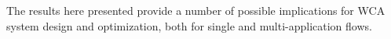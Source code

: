 \documentclass[10pt,letterpaper]{article}
\providecommand{\DIFdelbegin}{\protect\color{red}} %
\newcommand{\DIFscaledelfig}{0.5}
\newlength{\DIFdelgraphicswidth} %
\newlength{\DIFdelgraphicsheight} %
\newcommand{\DIFdelincludegraphics}[2][]{%
\sbox{\DIFdelgraphicsbox}{\DIFOincludegraphics[#1]{#2}}%
\settoboxwidth{\DIFdelgraphicswidth}{\DIFdelgraphicsbox} %
\settoboxtotalheight{\DIFdelgraphicsheight}{\DIFdelgraphicsbox} %
\scalebox{\DIFscaledelfig}{%
\parbox[b]{\DIFdelgraphicswidth}{\usebox{\DIFdelgraphicsbox}\\[-\baselineskip] \rule{\DIFdelgraphicswidth}{0em}}\llap{\resizebox{\DIFdelgraphicswidth}{\DIFdelgraphicsheight}{%
\setlength{\unitlength}{\DIFdelgraphicswidth}%
\begin{picture}(1,1)%
\thicklines\linethickness{2pt} %
{\color[rgb]{1,0,0}\put(0,0){\framebox(1,1){}}}%
{\color[rgb]{1,0,0}\put(0,0){\line( 1,1){1}}}%
{\color[rgb]{1,0,0}\put(0,1){\line(1,-1){1}}}%
\end{picture}%
}\hspace*{3pt}}} %
} %
\DeclareRobustCommand{\DIFdelbegin}{\DIFOdelbegin \let\includegraphics\DIFdelincludegraphics} %
\begin{document}
The results here presented provide a number of possible implications for WCA system design and optimization, both for single and multi-application flows.

\DIFdelbegin %




\end{document}
